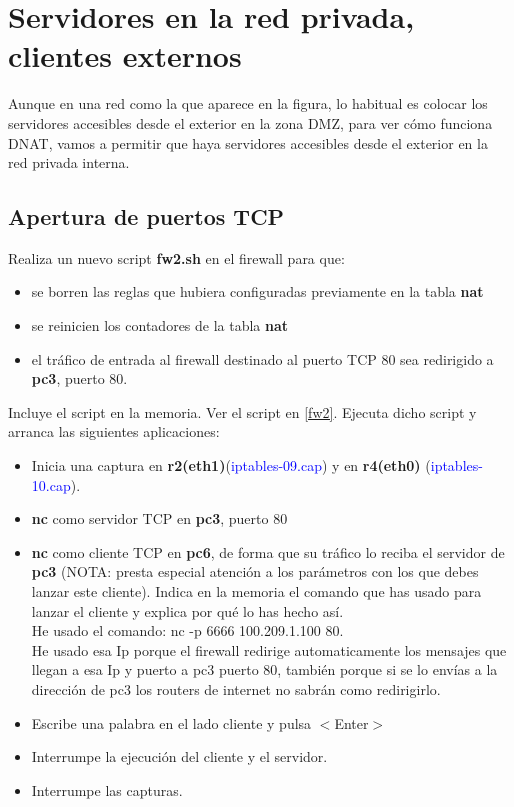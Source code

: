 \documentclass[12pt, a4paper]{report}
\begin{document}
\section{Servidores en la red privada, clientes externos}
Aunque en una red como la que aparece en la figura, lo habitual es colocar los servidores accesibles
desde el exterior en la zona DMZ, para ver cómo funciona DNAT, vamos a permitir que haya servidores
accesibles desde el exterior en la red privada interna.
\subsection{Apertura de puertos TCP}
Realiza un nuevo script \textbf{fw2.sh} en el firewall para que:
\begin{itemize}
	\item se borren las reglas que hubiera configuradas previamente en la tabla \textbf{nat}
	\item se reinicien los contadores de la tabla \textbf{nat}
	\item el tráfico de entrada al firewall destinado al puerto TCP 80 sea redirigido a \textbf{pc3}, puerto 80.
\end{itemize}
Incluye el script en la memoria. Ver el script en \ref{fw2}. Ejecuta dicho script y arranca las siguientes aplicaciones:
\begin{itemize}
	\item Inicia una captura en \textbf{r2(eth1)}(\textcolor{blue}{iptables-09.cap}) y en \textbf{r4(eth0)} (\textcolor{blue}{iptables-10.cap}).
	\item \textbf{nc }como servidor TCP en \textbf{pc3}, puerto 80
	\item \textbf{nc} como cliente TCP en \textbf{pc6}, de forma que su tráfico lo reciba el servidor de \textbf{pc3} (NOTA: presta
	especial atención a los parámetros con los que debes lanzar este cliente). Indica en la memoria el
	comando que has usado para lanzar el cliente y explica por qué lo has hecho así.\\
	
	He usado el comando: nc -p 6666 100.209.1.100 80.\\
	He usado esa Ip porque el firewall redirige automaticamente los mensajes que llegan a esa Ip y puerto a pc3 puerto 80, también porque si se lo envías a la dirección de pc3 los routers de internet no sabrán como redirigirlo.
	\item Escribe una palabra en el lado cliente y pulsa $<$Enter$>$
	\item Interrumpe la ejecución del cliente y el servidor.
	\item Interrumpe las capturas.
\end{itemize}
\end{document}
